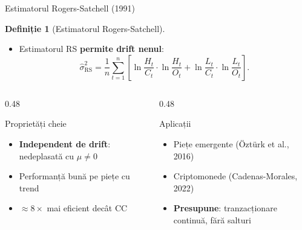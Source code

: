\documentclass[9pt, aspectratio=169, t]{beamer}
\theoremstyle{definition}
\newtheorem{defn}{Definiție}
\begin{document}
\begin{frame}{Estimatorul Rogers-Satchell (1991)}
\begin{defn}[Estimatorul Rogers-Satchell]
\begin{itemize}\setlength{\itemsep}{1pt}
    \item Estimatorul RS \textbf{permite drift nenul}:
    {\small
    \[
    \hat{\sigma}_{\text{RS}}^2 = \frac{1}{n}\sum_{t=1}^{n}\!\left[\ln\frac{H_t}{C_t}\cdot\ln\frac{H_t}{O_t} + \ln\frac{L_t}{C_t}\cdot\ln\frac{L_t}{O_t}\right].
    \]
    }
\end{itemize}
\end{defn}
\begin{columns}[T]
\begin{column}{0.48\textwidth}
\begin{block}{Proprietăți cheie}
\begin{itemize}\setlength{\itemsep}{0pt}
    \item \textbf{Independent de drift}: nedeplasată cu $\mu\neq0$
    \item Performanță bună pe piețe cu trend
    \item $\approx 8\times$ mai eficient decât CC
\end{itemize}
\end{block}
\end{column}
\begin{column}{0.48\textwidth}
\begin{block}{Aplicații}
\begin{itemize}\setlength{\itemsep}{0pt}
    \item Piețe emergente (\"{O}zt\"{u}rk et al., 2016)
    \item Criptomonede (Cadenas-Morales, 2022)
    \item \textbf{Presupune}: tranzacționare continuă, fără salturi
\end{itemize}
\end{block}
\end{column}
\end{columns}
\end{frame}
\end{document}
